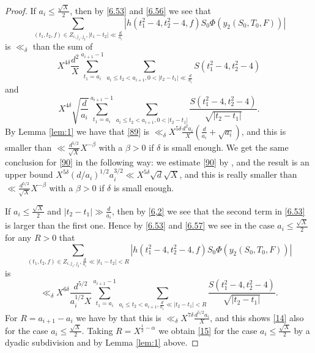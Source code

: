 \documentclass[12pt]{amsart}
\theoremstyle{definition}
\numberwithin{equation}{section}
\begin{document}
\begin{proof}
If $a_i\le\frac {\sqrt {X}}2$, then by \eqref{6.53} and
\eqref{6.56} we see that
\begin{equation}\sum_{\left(t_1,t_2,f\right)\in Z_{i,j_1,j_2},\left
|t_1-t_2\right|\ll\frac d{a_i}}\left|h\left(t_1^2-4,t_2^2-4,f\right
)S_0\Phi\left(y_2\left(S_0,T_0,F\right)\right)\right|\end{equation}
is $\ll_{\delta}$ than the sum of
\begin{equation}X^{4\delta}\frac {d^2}X\sum_{t_1=a_i}^{a_{i+1}-1}
\sum_{a_i\le t_2<a_{i+1},0<\left|t_2-t_1\right|\ll\frac d{a_i}}S\left
(t^2_1-4,t^2_2-4\right)\label{89}\end{equation}
and
\begin{equation}X^{4\delta}\sqrt {\frac d{a_i}}\sum_{t_1=a_i}^{a_{
i+1}-1}\sum_{a_i\le t_2<a_{i+1},0<\left|t_2-t_1\right|}\frac {S\left
(t^2_1-4,t^2_2-4\right)}{\sqrt {\left|t_2-t_1\right|}}.\label{90}\end{equation}
By Lemma \ref{lem:1} we have that \eqref{89} is
$\ll_{\delta}X^{5\delta}\frac {d^2a_i}X\left(\frac d{a_i}+\sqrt {
a_i}\right)$, and this is smaller than $\ll\frac {d^{5/2}}{\sqrt {
X}}X^{-\beta}$
with a $\beta >0$ if $\delta$ is small enough. We get the same
conclusion for \eqref{90} in the following way: we estimate \eqref{90} by
\cite[(3.21)]{Biro}, and the result is an upper bound
$X^{5\delta}\left(d/a_i\right)^{1/2}a_i^{3/2}\ll X^{5\delta}\sqrt {
d}\sqrt {X}$, and this is really smaller than $\ll\frac {d^{5/2}}{\sqrt {
X}}X^{-\beta}$
with a $\beta >0$ if $\delta$ is small enough.

If $a_i\le\frac {\sqrt {X}}2$ and $\left|t_2-t_1\right|\gg\frac d{
a_i}$, then by \eqref{6,2} we see that
the second term in \eqref{6.53} is larger than the first one.
Hence by \eqref{6.53} and \eqref{6.57} we see in the case
$a_i\le\frac {\sqrt {X}}2$ for any $R>0$ that
\begin{equation}\sum_{\left(t_1,t_2,f\right)\in Z_{i,j_1,j_2},\frac
d{a_i}\ll\left|t_1-t_2\right|<R}\left|h\left(t_1^2-4,t_2^2-4,f\right
)S_0\Phi\left(y_2\left(S_0,T_0,F\right)\right)\right|\end{equation}
is
\[\ll_{\delta}X^{6\delta}\frac {d^{5/2}}{a_i^{1/2}X}\sum_{t_1=a_i}^{
a_{i+1}-1}\sum_{a_i\le t_2<a_{i+1},\frac d{a_i}\ll\left|t_2-t_1\right
|<R}\frac {S\left(t^2_1-4,t^2_2-4\right)}{\sqrt {\left|t_2-t_1\right
|}}.\]
For $R=a_{i+1}-a_i$ we have by \cite[(3.21)]{Biro} that this
is $\ll_{\delta}X^{7\delta}\frac {d^{5/2}a_i}X$, and this shows \eqref{14} also for the
case $a_i\le\frac {\sqrt {X}}2$. Taking $R=X^{\frac 12-\alpha}$ we
obtain \eqref{15} for the case $a_i\le\frac {\sqrt {X}}2$ by a dyadic
subdivision and by Lemma \ref{lem:1} above.


\end{proof}
\end{document}
